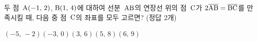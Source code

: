 두 점~$\mathrm{A}(-1,\,2)$, $\mathrm{B}(1,\,4)$에 대하여 선분~$\mathrm{AB}$의 연장선 위의 점~$\mathrm{C}$가 $2\overline{\mathrm{AB}}=\overline{\mathrm{BC}}$를 만족시킬 때, 다음 중 점~$\mathrm{C}$의 좌표를 모두 고르면? (정답 2개)
\begin{choices32}{$(-5,\,-2)$}{$(-3,\,0)$}{$(3,\,6)$}{$(5,\,8)$}{$(6,\,9)$}\end{choices32}
